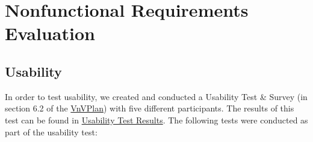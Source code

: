 \documentclass[12pt, titlepage]{article}
\begin{document}
\section{Nonfunctional Requirements Evaluation}

\subsection{Usability}

In order to test usability, we created and conducted a Usability Test \& Survey (in section 6.2 of the
\href{https://github.com/davimang/REACH/blob/main/docs/VnVPlan/VnVPlan.pdf}{VnVPlan}) with five different participants.
The results of this test can be found in \href{https://github.com/davimang/REACH/blob/main/docs/VnVReport/UsabilityTestResults/UsabilityTestResults.pdf}{Usability Test Results}.
The following tests were conducted as part of the usability test:
\end{document}
